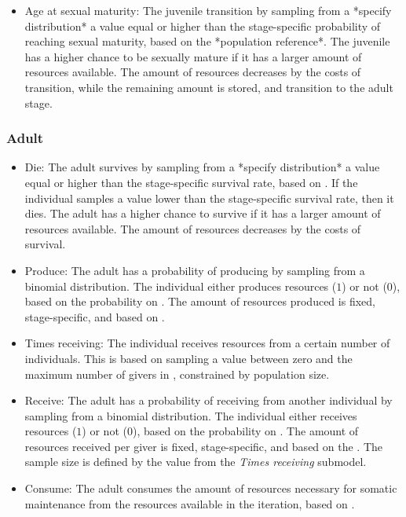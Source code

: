 \documentclass{article}
\begin{document}
\begin{itemize}
    \item Age at sexual maturity: The juvenile transition by sampling from a *specify distribution* a value equal or higher than the stage-specific probability of reaching sexual maturity, based on the *population reference*. The juvenile has a higher chance to be sexually mature if it has a larger amount of resources available. The amount of resources decreases by the costs of transition, while the remaining amount is stored, and transition to the adult stage.
\end{itemize}

\subsubsection{Adult}

\begin{itemize}
    \item Die: The adult survives by sampling from a *specify distribution* a value equal or higher than the stage-specific survival rate, based on \cite{gurven2007longevity}. If the individual samples a value lower than the stage-specific survival rate, then it dies. The adult has a higher chance to survive if it has a larger amount of resources available. The amount of resources decreases by the costs of survival.
    \item Produce: The adult has a probability of producing by sampling from a binomial distribution. The individual either produces resources ($1$) or not ($0$), based on the probability on \cite{koster2020life}. The amount of resources produced is fixed, stage-specific, and based on \cite{koster2020life}.
    \item Times receiving: The individual receives resources from a certain number of individuals. This is based on sampling a value between zero and the maximum number of givers in \cite{gurven2004give}, constrained by population size.
    \item Receive: The adult has a probability of receiving from another individual by sampling from a binomial distribution. The individual either receives resources ($1$) or not ($0$), based on the probability on \cite{gurven2004give}. The amount of resources received per giver is fixed, stage-specific, and based on the \cite{gurven2004give}. The sample size is defined by the value from the \emph{Times receiving} submodel. 
    \item Consume: The adult consumes the amount of resources necessary for somatic maintenance from the resources available in the iteration, based on \cite{kaplan2000theory}.

\end{itemize}
\end{document}
